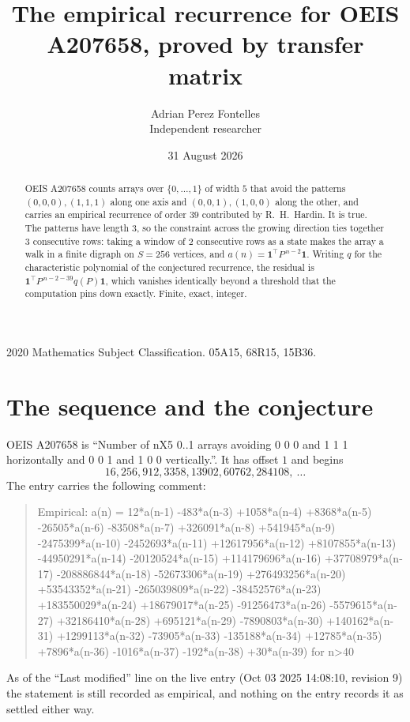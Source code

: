 \documentclass[11pt,a4paper]{article}
\title{The empirical recurrence for OEIS A207658, proved by transfer matrix}
\author{Adrian Perez Fontelles\\ \small Independent researcher}
\date{31 August 2026}
\theoremstyle{plain}
\theoremstyle{definition}
\begin{document}
\maketitle

\begin{abstract}
OEIS A207658 counts arrays over $\{0,\dots,1\}$ of width $5$ that avoid the patterns
$(0,0,0), (1,1,1)$ along one axis and $(0,0,1), (1,0,0)$ along the other, and carries an empirical recurrence of
order $39$ contributed by R.~H.~Hardin. It is true. The patterns have length $3$, so
the constraint across the growing direction ties together $3$ consecutive rows: taking a
window of $2$ consecutive rows as a state makes the array a walk in a finite digraph
on $S=256$ vertices, and $a(n)=\mathbf{1}^{\!\top}P^{\,n-2}\mathbf{1}$. Writing $q$
for the characteristic polynomial of the conjectured recurrence, the residual is
$\mathbf{1}^{\!\top}P^{\,n-2-39}q(P)\mathbf{1}$, which vanishes identically
beyond a threshold that the computation pins down exactly. Finite, exact, integer.
\end{abstract}

\noindent\small 2020 Mathematics Subject Classification. 05A15, 68R15, 15B36.\normalsize

\section{The sequence and the conjecture}

OEIS A207658 is ``Number of nX5 0..1 arrays avoiding 0 0 0 and 1 1 1 horizontally and 0 0 1 and 1 0 0 vertically.''. It has offset
$1$ and begins
\[
16, 256, 912, 3358, 13902, 60762, 284108,\ \dots
\]
The entry carries the following comment:
\begin{quote}\small
Empirical: a(n) = 12*a(n-1) -483*a(n-3) +1058*a(n-4) +8368*a(n-5) -26505*a(n-6) -83508*a(n-7) +326091*a(n-8) +541945*a(n-9) -2475399*a(n-10) -2452693*a(n-11) +12617956*a(n-12) +8107855*a(n-13) -44950291*a(n-14) -20120524*a(n-15) +114179696*a(n-16) +37708979*a(n-17) -208886844*a(n-18) -52673306*a(n-19) +276493256*a(n-20) +53543352*a(n-21) -265039809*a(n-22) -38452576*a(n-23) +183550029*a(n-24) +18679017*a(n-25) -91256473*a(n-26) -5579615*a(n-27) +32186410*a(n-28) +695121*a(n-29) -7890803*a(n-30) +140162*a(n-31) +1299113*a(n-32) -73905*a(n-33) -135188*a(n-34) +12785*a(n-35) +7896*a(n-36) -1016*a(n-37) -192*a(n-38) +30*a(n-39) for n>40
\end{quote}
As of the ``Last modified'' line on the live entry (Oct 03 2025 14:08:10, revision
9) the statement is still recorded as empirical, and nothing on the entry
records it as settled either way.
\end{document}
